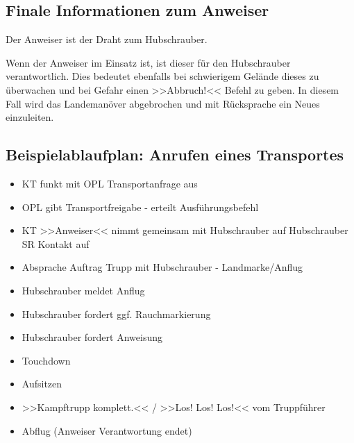 \subsection{Finale Informationen zum Anweiser}

	Der Anweiser ist der Draht zum Hubschrauber.

	Wenn der Anweiser im Einsatz ist, ist dieser für den Hubschrauber verantwortlich. Dies bedeutet ebenfalls bei schwierigem Gelände dieses zu überwachen und bei Gefahr einen >>Abbruch!<< Befehl zu geben. In diesem Fall wird das Landemanöver abgebrochen und mit Rücksprache ein Neues einzuleiten.

 

\subsection{Beispielablaufplan: Anrufen eines Transportes}

	\begin{itemize}

		\item KT funkt mit OPL Transportanfrage aus

    		\item OPL gibt Transportfreigabe - erteilt Ausführungsbefehl

    		\item KT >>Anweiser<< nimmt gemeinsam mit Hubschrauber auf Hubschrauber SR Kontakt auf

    		\item Absprache Auftrag Trupp mit Hubschrauber - Landmarke/Anflug

		\item  Hubschrauber meldet Anflug

    		\item Hubschrauber fordert ggf. Rauchmarkierung

    		\item Hubschrauber fordert Anweisung

    		\item Touchdown

    		\item Aufsitzen

    		\item >>Kampftrupp komplett.<< / >>Los! Los! Los!<< vom Truppführer

    		\item Abflug (Anweiser Verantwortung endet)

	\end{itemize}
